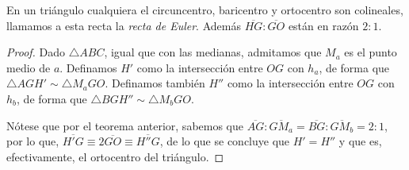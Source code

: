 \documentclass[11pt,a4paper]{book}
\begin{document}
\begin{thm}
	En un triángulo cualquiera el circuncentro, baricentro y ortocentro son colineales, llamamos a esta recta la \textit{recta de Euler}. Además $\overline{HG}:\overline{GO}$ están en razón $2:1$.
\end{thm}
\begin{proof}
	Dado $\triangle ABC$, igual que con las medianas, admitamos que $M_a$ es el punto medio de $a$. Definamos $H'$ como la intersección entre $OG$ con $h_a$, de forma que $\triangle AGH'\sim\triangle M_aGO$. Definamos también $H''$ como la intersección entre $OG$ con $h_b$, de forma que $\triangle BGH''\sim\triangle M_bGO$.

	Nótese que por el teorema anterior, sabemos que $\overline{AG}:\overline{GM_a}=\overline{BG}:\overline{GM_b}=2:1$, por lo que, $\overline{H'G}\equiv2\overline{GO}\equiv\overline{H''G}$, de lo que se concluye que $H'=H''$ y que es, efectivamente, el ortocentro del triángulo.
\end{proof}
\end{document}
